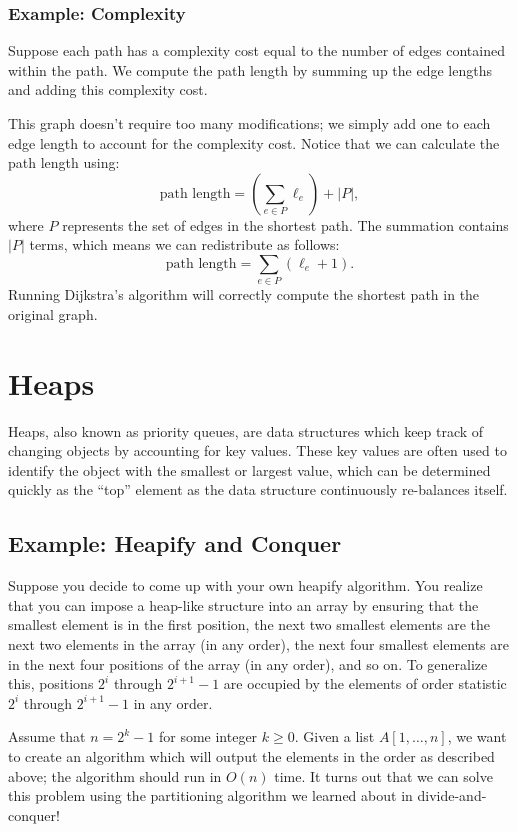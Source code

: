 \documentclass[11pt]{article}
\begin{document}
\subsubsection{Example: Complexity}
Suppose each path has a complexity cost equal to the number of edges contained within the path. We compute the path length by summing up the edge lengths and adding this complexity cost. 

This graph doesn't require too many modifications; we simply add one to each edge length to account for the complexity cost. Notice that we can calculate the path length using:
\begin{equation*}
    \text{path length} = \left(\sum_{e \in P} \ell_e\right) + |P|, 
\end{equation*}
where $P$ represents the set of edges in the shortest path. The summation contains $|P|$ terms, which means we can redistribute as follows:
\begin{equation*}
    \text{path length} = \sum_{e \in P} (\ell_e + 1).
\end{equation*}
Running Dijkstra's algorithm will correctly compute the shortest path in the original graph. 

\section{Heaps}
Heaps, also known as priority queues, are data structures which keep track of changing objects by accounting for key values. These key values are often used to identify the object with the smallest or largest value, which can be determined quickly as the ``top'' element as the data structure continuously re-balances itself. 

\subsection{Example: Heapify and Conquer}
Suppose you decide to come up with your own heapify algorithm. You realize that you can impose a heap-like structure into an array by ensuring that the smallest element is in the first position, the next two smallest elements are the next two elements in the array (in any order), the next four smallest elements are in the next four positions of the array (in any order), and so on. To generalize this, positions $2^i$ through $2^{i+1} - 1$ are occupied by the elements of order statistic $2^i$ through $2^{i+1} - 1$ in any order.

Assume that $n = 2^k - 1$ for some integer $k \geq 0$. Given a list $A[1, \dots, n]$, we want to create an algorithm which will output the elements in the order as described above; the algorithm should run in $O(n)$ time. It turns out that we can solve this problem using the partitioning algorithm we learned about in divide-and-conquer!
\end{document}
